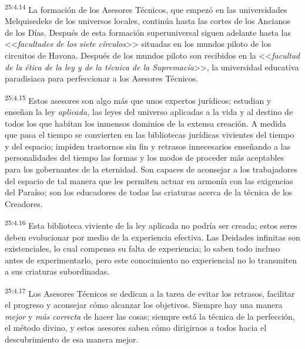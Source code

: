 \par
\textsuperscript{25:4.14} La formación de los Asesores Técnicos, que empezó en las universidades Melquisedeks de los universos locales, continúa hasta las cortes de los Ancianos de los Días. Después de esta formación superuniversal siguen adelante hasta las <<\textit{facultades de los siete círculos}>> situadas en los mundos piloto de los circuitos de Havona. Después de los mundos piloto son recibidos en la <<\textit{facultad de la ética de la ley y de la técnica de la Supremacía}>>, la universidad educativa paradisiaca para perfeccionar a los Asesores Técnicos.

\par
\textsuperscript{25:4.15} Estos asesores son algo más que unos expertos jurídicos; estudian y enseñan la ley \textit{aplicada,} las leyes del universo aplicadas a la vida y al destino de todos los que habitan los inmensos dominios de la extensa creación. A medida que pasa el tiempo se convierten en las bibliotecas jurídicas vivientes del tiempo y del espacio; impiden trastornos sin fin y retrasos innecesarios enseñando a las personalidades del tiempo las formas y los modos de proceder más aceptables para los gobernantes de la eternidad. Son capaces de aconsejar a los trabajadores del espacio de tal manera que les permiten actuar en armonía con las exigencias del Paraíso; son los educadores de todas las criaturas acerca de la técnica de los Creadores.

\par
\textsuperscript{25:4.16} Esta biblioteca viviente de la ley aplicada no podría ser creada; estos seres deben evolucionar por medio de la experiencia efectiva. Las Deidades infinitas son existenciales, lo cual compensa su falta de experiencia; lo saben todo incluso antes de experimentarlo, pero este conocimiento no experiencial no lo transmiten a sus criaturas subordinadas.

\par
\textsuperscript{25:4.17} Los Asesores Técnicos se dedican a la tarea de evitar los retrasos, facilitar el progreso y aconsejar cómo alcanzar los objetivos. Siempre hay una manera \textit{mejor} y \textit{más correcta} de hacer las cosas; siempre está la técnica de la perfección, el método divino, y estos asesores saben cómo dirigirnos a todos hacia el descubrimiento de esa manera mejor.

